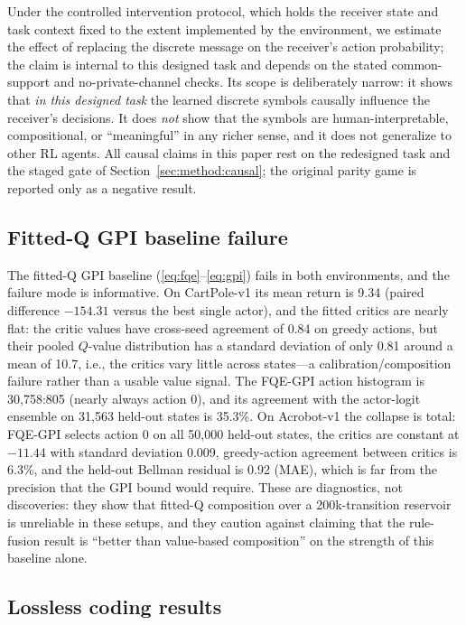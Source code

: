 \documentclass[11pt]{article}
\begin{document}
Under the controlled intervention protocol, which holds the receiver state and task context fixed to
the extent implemented by the environment, we estimate the effect of replacing the discrete message on
the receiver's action probability; the claim is internal to this designed task and depends on the
stated common-support and no-private-channel checks. Its scope is deliberately
narrow: it shows that \emph{in this designed task} the learned discrete symbols causally influence the
receiver's decisions. It does \emph{not} show that the symbols are human-interpretable, compositional,
or ``meaningful'' in any richer sense, and it does not generalize to other RL agents. All causal claims
in this paper rest on the redesigned task and the staged gate of Section~\ref{sec:method:causal}; the
original parity game is reported only as a negative result.

\subsection{Fitted-Q GPI baseline failure}
\label{sec:experiments:fqe}

The fitted-Q GPI baseline (\ref{eq:fqe}--\ref{eq:gpi}) fails in both environments, and the failure
mode is informative. On CartPole-v1 its mean return is 9.34 (paired difference $-154.31$ versus the
best single actor), and the fitted critics are nearly flat: the critic values have cross-seed
agreement of 0.84 on greedy actions, but their pooled $Q$-value distribution has a standard deviation
of only 0.81 around a mean of 10.7, i.e., the critics vary little across states---a
calibration/composition failure rather than a usable value signal. The FQE-GPI action
histogram is 30{,}758:805 (nearly always action 0), and its agreement with the actor-logit ensemble
on 31{,}563 held-out states is 35.3\%. On Acrobot-v1 the collapse is total: FQE-GPI selects action 0
on all 50{,}000 held-out states, the critics are constant at $-11.44$ with standard deviation
0.009, greedy-action agreement between critics is 6.3\%, and the held-out Bellman residual is 0.92
(MAE), which is far from the precision that the GPI bound would require. These are diagnostics, not
discoveries: they show that fitted-Q composition over a 200k-transition reservoir is unreliable in
these setups, and they caution against claiming that the rule-fusion result is ``better than
value-based composition'' on the strength of this baseline alone.

\subsection{Lossless coding results}
\label{sec:experiments:codec}
\end{document}
